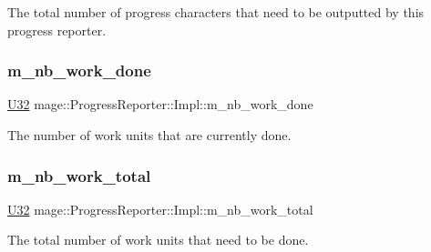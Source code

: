 The total number of progress characters that need to be outputted by this progress reporter. \hypertarget{classmage_1_1_progress_reporter_1_1_impl_ad35ff8031b2826f41912abc44dbd1d24}{}\label{classmage_1_1_progress_reporter_1_1_impl_ad35ff8031b2826f41912abc44dbd1d24} 
\subsubsection{\texorpdfstring{m\+\_\+nb\+\_\+work\+\_\+done}{m\_nb\_work\_done}}
{\footnotesize\ttfamily \hyperlink{namespacemage_a41c104c036fba3756a74e19f793eeaa1}{U32} mage\+::\+Progress\+Reporter\+::\+Impl\+::m\+\_\+nb\+\_\+work\+\_\+done\hspace{0.3cm}{\ttfamily [private]}}

The number of work units that are currently done. \hypertarget{classmage_1_1_progress_reporter_1_1_impl_a58c67973a05cb65276612f56ff4409a6}{}\label{classmage_1_1_progress_reporter_1_1_impl_a58c67973a05cb65276612f56ff4409a6} 
\subsubsection{\texorpdfstring{m\+\_\+nb\+\_\+work\+\_\+total}{m\_nb\_work\_total}}
{\footnotesize\ttfamily \hyperlink{namespacemage_a41c104c036fba3756a74e19f793eeaa1}{U32} mage\+::\+Progress\+Reporter\+::\+Impl\+::m\+\_\+nb\+\_\+work\+\_\+total\hspace{0.3cm}{\ttfamily [private]}}

The total number of work units that need to be done. \hypertarget{classmage_1_1_progress_reporter_1_1_impl_a6796267101fa30e107ed0d5031a8dca3}{}\label{classmage_1_1_progress_reporter_1_1_impl_a6796267101fa30e107ed0d5031a8dca3} 
